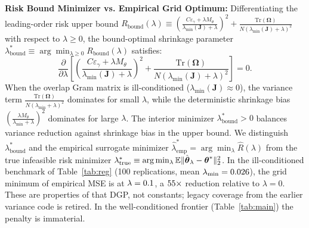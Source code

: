 \textbf{Risk Bound Minimizer vs. Empirical Grid Optimum:}
Differentiating the leading-order risk upper bound $R_{\mathrm{bound}}(\lambda) \equiv \left(\frac{C \varepsilon_\gamma + \lambda M_\theta}{\lambda_{\min}(\boldsymbol{J}) + \lambda}\right)^2 + \frac{\mathrm{Tr}(\boldsymbol{\Omega})}{N (\lambda_{\min}(\boldsymbol{J}) + \lambda)^2}$ with respect to $\lambda \ge 0$, the bound-optimal shrinkage parameter $\lambda^*_{\mathrm{bound}} \equiv \arg\min_{\lambda \ge 0} R_{\mathrm{bound}}(\lambda)$ satisfies:
\begin{equation}
    \frac{\partial}{\partial \lambda} \left[ \left(\frac{C \varepsilon_\gamma + \lambda M_\theta}{\lambda_{\min}(\boldsymbol{J}) + \lambda}\right)^2 + \frac{\mathrm{Tr}(\boldsymbol{\Omega})}{N (\lambda_{\min}(\boldsymbol{J}) + \lambda)^2} \right] = 0.
\end{equation}
When the overlap Gram matrix is ill-conditioned ($\lambda_{\min}(\boldsymbol{J}) \approx 0$), the variance term $\frac{\mathrm{Tr}(\boldsymbol{\Omega})}{N (\lambda_{\min} + \lambda)^2}$ dominates for small $\lambda$, while the deterministic shrinkage bias $(\frac{\lambda M_\theta}{\lambda_{\min} + \lambda})^2$ dominates for large $\lambda$. The interior minimizer $\lambda^*_{\mathrm{bound}} > 0$ balances variance reduction against shrinkage bias in the upper bound. We distinguish $\lambda^*_{\mathrm{bound}}$ and the empirical surrogate minimizer $\hat{\lambda}^*_{\mathrm{emp}} = \arg\min_\lambda \hat{R}(\lambda)$ from the true infeasible risk minimizer $\lambda^*_{\mathrm{true}} \equiv \arg\min_\lambda \mathbb{E}\|\hat{\boldsymbol{\theta}}_\lambda - \boldsymbol{\theta}^*\|_2^2$.
In the ill-conditioned benchmark of Table~\ref{tab:reg} (100 replications, mean $\lambda_{\min}=0.026$), the grid minimum of empirical MSE is at $\lambda=0.1$, a $55\times$ reduction relative to $\lambda=0$. These are properties of that DGP, not constants; legacy coverage from the earlier variance code is retired. In the well-conditioned frontier (Table~\ref{tab:main}) the penalty is immaterial.
\begin{table}[h]\centering\footnotesize
\caption{Regularization path in an ill-conditioned design (\texttt{reports/or\_dml\_regularization\_frontier.csv}).}\label{tab:reg}

\end{table}

